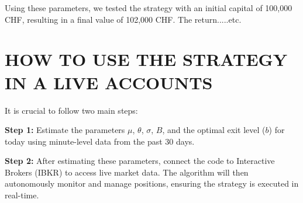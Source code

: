\documentclass{article}
\begin{document}
Using these parameters, we tested the strategy with an initial capital of 100,000 CHF, resulting in a final value of 102,000 CHF.
The return.....etc.

\section{HOW TO USE THE STRATEGY IN A LIVE ACCOUNTS}
It is crucial to follow two main steps:

\textbf{Step 1:} Estimate the parameters \( \mu \), \( \theta \), \( \sigma \), \( B \), and the optimal exit level (\( b \)) for today using minute-level data from the past 30 days.

\textbf{Step 2:} After estimating these parameters, connect the code to Interactive Brokers (IBKR) to access live market data. The algorithm will then autonomously monitor and manage positions, ensuring the strategy is executed in real-time.
\end{document}
